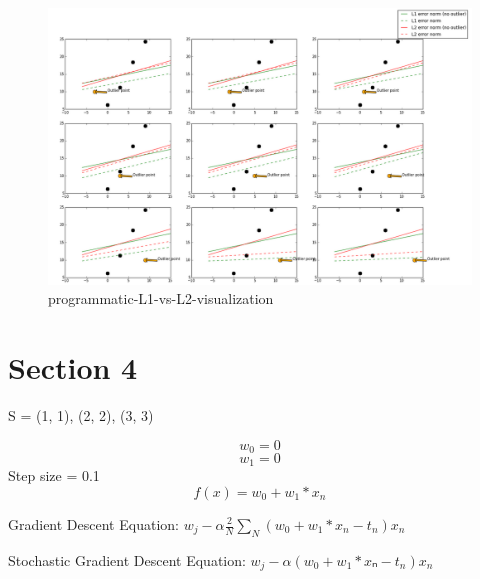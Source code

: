 \documentclass{report}
\begin{document}
\begin{figure}[h!]
\includegraphics[width=\linewidth]{programmatic-L1-vs-L2-visualization.png}
\caption{programmatic-L1-vs-L2-visualization}
\label{fig:programmatic-L1-vs-L2-visualization}
\end{figure}

\chapter{Section 4}
S = {(1, 1), (2, 2), (3, 3)}

$$w_0 = 0$$
$$w_1 = 0$$
Step size = 0.1
$$f(x) = w_0+w_1*x_n$$

Gradient Descent Equation: $w_j - \alpha \frac{2}{N} \sum_{N }(w_0 + w_1*x_n-t_n)x_n$

Stochastic Gradient Descent Equation: $w_j - \alpha (w_0 + w_1*xₙ-t_n)x_n$
\end{document}
